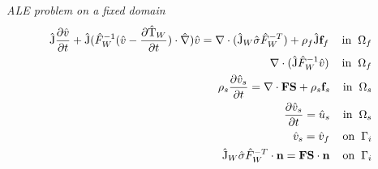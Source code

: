 \begin{equat}
\textit{ALE problem on a fixed domain}
\begin{align}
\text{\^{J}} \frac{\partial \hat{v}}{\partial t} + \text{\^{J}} (\hat{F}_W^{-1}(\hat{v} - \frac{\partial \text{\^{T}}_W}{\partial t}) \cdot \hat{\nabla}) \hat{v}
= \nabla \cdot (\text{\^{J}}_W \hat{\sigma}\hat{F}_W^{-T}) + \rho_f \text{\^{J}} \mathbf{f}_f
\hspace{4mm} \text{in} \hspace{2mm} \Omega_f \\
\nabla \cdot (\text{\^{J}} \hat{F}_W^{-1} \hat{v}) \hspace{4mm} \text{in} \hspace{2mm} \Omega_f \\
\rho_s \frac{\partial \hat{v}_s}{\partial t} = \nabla \cdot \mathbf{F}\mathbf{S} + \rho_s \mathbf{f}_s
\hspace{4mm} \text{in} \hspace{2mm} \Omega_s \\
\frac{\partial \hat{v}_s}{\partial t} = \hat{u}_s \hspace{4mm} \text{in} \hspace{2mm} \Omega_s \\
\hat{v}_s = \hat{v}_f \hspace{4mm} \text{on} \hspace{2mm} \Gamma_i \\
\text{\^{J}}_W \hat{\sigma}\hat{F}_W^{-T} \cdot \mathbf{n} = 
\mathbf{F}\mathbf{S} \cdot \mathbf{n}  \hspace{4mm} \text{on} \hspace{2mm} \Gamma_i 
\end{align}
\end{equat}


